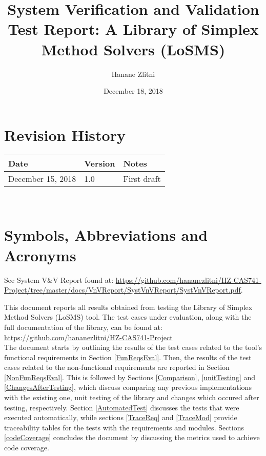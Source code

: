 \documentclass[12pt, titlepage]{article}
\newcommand{\progname}{Library of Simplex Method Solvers}
\newcommand{\famname}{LoSMS}
\begin{document}
\title{System Verification and Validation Test Report: A \progname{} 
(\famname{})} 
\author{Hanane Zlitni}
\date{December 18, 2018}
	
\maketitle


\section{Revision History}

\begin{tabularx}{\textwidth}{p{3cm}p{2cm}X}
\toprule {\bf Date} & {\bf Version} & {\bf Notes}\\
\midrule
December 15, 2018 & 1.0 & First draft\\
\bottomrule
\end{tabularx}

~\newpage

\section{Symbols, Abbreviations and Acronyms}

See System V\&V Report found at: 
\url{https://github.com/hananezlitni/HZ-CAS741-Project/tree/master/docs/VnVReport/SystVnVReport/SystVnVReport.pdf}.

\newpage

\tableofcontents

\listoftables %

\newpage


This document reports all results obtained from testing the \progname{} 
(\famname{}) tool. The test cases under evaluation, along with the full 
documentation of the library, can be found at: 
\url{https://github.com/hananezlitni/HZ-CAS741-Project} \\

The document starts by outlining the results of the test cases related to the 
tool's functional requirements in Section \ref{FunReqsEval}. Then, the results 
of the test cases related to the non-functional requirements are reported in 
Section \ref{NonFunReqsEval}. This is followed by Sections 
\ref{Comparison}, \ref{unitTesting} and \ref{ChangesAfterTesting}, which 
discuss comparing any previous implementations with the existing one, unit 
testing of the library and changes which occured after testing, respectively. 
Section \ref{AutomatedTest} discusses the tests that were executed 
automatically, while sections \ref{TraceReq} and \ref{TraceMod} provide 
traceability tables for the tests with the requirements and modules. Sections 
\ref{codeCoverage} concludes the document by discussing the metrics used to 
achieve code coverage.
\end{document}
